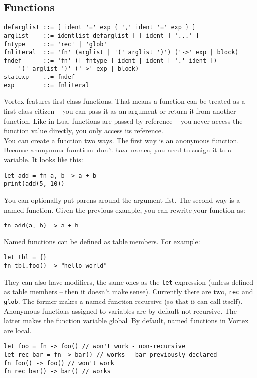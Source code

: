 \documentclass{article}
\begin{document}
\subsection{Functions}
\begin{lstlisting}[language=bnf]
defarglist ::= [ ident '=' exp { ',' ident '=' exp } ]
arglist    ::= identlist defarglist [ [ ident ] '...' ]
fntype     ::= 'rec' | 'glob'
fnliteral  ::= 'fn' (arglist | '(' arglist ')') ('->' exp | block)
fndef      ::= 'fn' ([ fntype ] ident | ident [ '.' ident ])
    '(' arglist ')' ('->' exp | block)
statexp    ::= fndef
exp        ::= fnliteral
\end{lstlisting}
Vortex features first class functions. That means a function can be treated
as a first class citizen -- you can pass it as an argument or return it from
another function. Like in Lua, functions are passed by reference -- you never
access the function value directly, you only access its reference.\\
You can create a function two ways. The first way is an anonymous function.
Because anonymous functions don't have names, you need to assign it to a
variable. It looks like this:
\begin{lstlisting}[language=vortex]
let add = fn a, b -> a + b
print(add(5, 10))
\end{lstlisting}
You can optionally put parens around the argument list. The second way is
a named function. Given the previous example, you can rewrite your function
as:
\begin{lstlisting}[language=vortex]
fn add(a, b) -> a + b
\end{lstlisting}
Named functions can be defined as table members. For example:
\begin{lstlisting}[language=vortex]
let tbl = {}
fn tbl.foo() -> "hello world"
\end{lstlisting}
They can also have modifiers, the same ones as the \verb|let| expression
(unless defined as table members -- then it doesn't make sense).
Currently there are two, \verb|rec| and \verb|glob|. The former makes a named
function recursive (so that it can call itself). Anonymous functions assigned
to variables are by default not recursive. The latter makes the function
variable global. By default, named functions in Vortex are local.
\begin{lstlisting}[language=vortex]
let foo = fn -> foo() // won't work - non-recursive
let rec bar = fn -> bar() // works - bar previously declared
fn foo() -> foo() // won't work
fn rec bar() -> bar() // works
\end{lstlisting}
\end{document}
